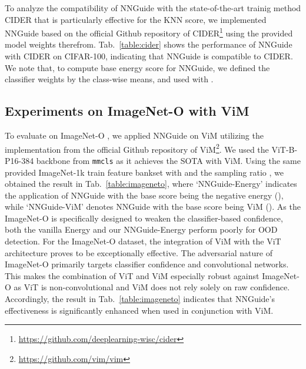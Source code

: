 \documentclass[10pt,twocolumn,letterpaper]{article}
\begin{document}
To analyze the compatibility of NNGuide with the state-of-the-art trainig method CIDER \cite{ming2022exploit} that is particularly effective for the KNN score, we implemented NNGuide based on the official Github repository of CIDER\footnote{\url{https://github.com/deeplearning-wisc/cider}} using the provided model weights therefrom. Tab.~\ref{table:cider} shows the performance of NNGuide with CIDER on CIFAR-100, indicating that NNGuide is compatible to CIDER. We note that, to compute base energy score for NNGuide, we defined the classifier weights by the class-wise means, and used  with .



\subsection{Experiments on ImageNet-O with ViM}

\begin{table}[t]
\centering
{}
\caption{
The result of NNGuide with ViM on ImageNet-O in (FPR95 / AUROC). Here, ID is the ImageNet-1k, and the backbone is ViT-B-P16-384.
}
\label{table:imageneto}
\end{table}

To evaluate on ImageNet-O \cite{hendrycks2021natural}, we applied NNGuide on ViM utilizing the implementation from the official Github repository of ViM\footnote{\url{https://github.com/vim/vim}}. 
We used the ViT-B-P16-384 backbone from \texttt{mmcls} as it achieves the SOTA with ViM.
Using the same provided ImageNet-1k train feature bankset with  and the sampling ratio , we obtained the result in Tab.~\ref{table:imageneto}, where `NNGuide-Energy' indicates the application of NNGuide with the base score being the negative energy (\ie ), while `NNGuide-ViM' denotes NNGuide with the base score being ViM (\ie ). As the ImageNet-O is specifically designed to weaken the classifier-based confidence, both the vanilla Energy and our NNGuide-Energy perform poorly for OOD detection. 
For the ImageNet-O dataset, the integration of ViM with the ViT architecture proves to be exceptionally effective. The adversarial nature of ImageNet-O primarily targets classifier confidence and convolutional networks. This makes the combination of ViT and ViM especially robust against ImageNet-O as ViT is non-convolutional and ViM does not rely solely on raw confidence. Accordingly, the result in Tab.~\ref{table:imageneto} indicates that NNGuide's effectiveness is significantly enhanced when used in conjunction with ViM.
\end{document}
